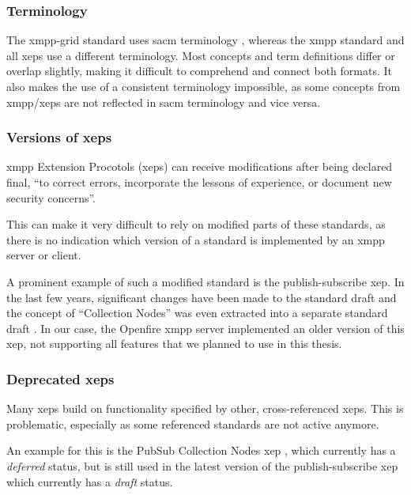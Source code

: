 \subsubsection{Terminology}

The \gls{xmpp-grid} standard uses \gls{sacm} terminology \cite{ietf-sacm-terminology-14}, whereas the \gls{xmpp} standard and all \glspl{xep} use a different terminology.
Most concepts and term definitions differ or overlap slightly, making it difficult to comprehend and connect both formats.
It also makes the use of a consistent terminology impossible, as some concepts from \gls{xmpp}/\glspl{xep} are not reflected in \gls{sacm} terminology and vice versa.

\subsubsection{Versions of \glspl{xep}}
\gls{xmpp} Extension Procotols (\glspl{xep}) can receive modifications after being declared final, 
``to correct errors, incorporate the lessons of experience, or document new security concerns''. \cite{xep-0001}

This can make it very difficult to rely on modified parts of these standards, as there is no indication which version of a standard is implemented by an \gls{xmpp} server or client.

A prominent example of such a modified standard is the \gls{publish-subscribe} \gls{xep}.
In the last few years, significant changes have been made to the standard draft
and the concept of ``Collection Nodes'' was even extracted into a separate standard draft \cite{xep-0248}.
In our case, the Openfire \gls{xmpp} server implemented an older version of this \gls{xep},
not supporting all features that we planned to use in this thesis.

\subsubsection{Deprecated \glspl{xep}}

Many \glspl{xep} build on functionality specified by other, cross-referenced \glspl{xep}.
This is problematic, especially as some referenced standards are not active anymore.

An example for this is the PubSub Collection Nodes \gls{xep} \cite{xep-0248}, which currently has a \emph{deferred} status, but is still used in the latest version of the \gls{publish-subscribe} \gls{xep} \cite{xep-0060} which currently has a \emph{draft} status.

